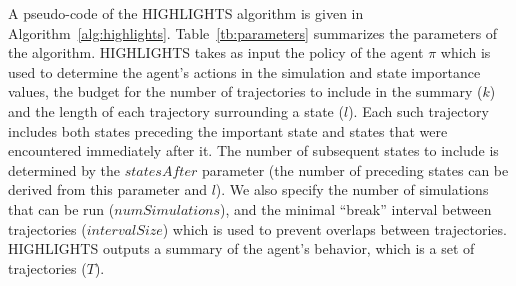 
A pseudo-code of the HIGHLIGHTS algorithm is  given in Algorithm~\ref{alg:highlights}. 
Table~\ref{tb:parameters} summarizes the parameters of the algorithm. 
HIGHLIGHTS takes as input the policy of the agent $\pi$ which is used to determine the agent's actions in the simulation and state importance values, the budget for the number of trajectories to include in the summary ($k$) and the length of each trajectory surrounding a state ($l$). Each such trajectory includes both states preceding  the important state and states that were encountered immediately after it. The number of subsequent states to include is determined by the $statesAfter$ parameter (the number of preceding states can be derived from this parameter and $l$). We also specify the number of simulations that can be run ($numSimulations$), and the minimal ``break'' interval between trajectories ($intervalSize$) which is used to prevent overlaps between trajectories. HIGHLIGHTS outputs a summary of the agent's behavior, which is a set of trajectories ($T$). 


